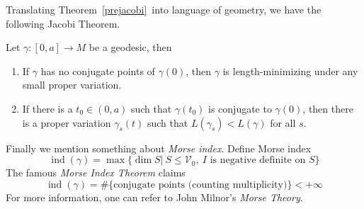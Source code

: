 Translating Theorem~\ref{prejacobi}~into language of geometry, we have the following Jacobi Theorem.
\begin{thm}[Jacobi]
    Let $\gamma:[0,a]\to M$ be a geodesic, then
    \begin{enumerate}[(1)]
        \item If $\gamma$ has no conjugate points of $\gamma(0)$, then $\gamma$ is length-minimizing under any small proper variation.
        \item If there is a $t_0\in(0,a)$ such that $\gamma(t_0)$ is conjugate to $\gamma(0)$, then there is a proper variation $\gamma_s(t)$ such that $L(\gamma_s)<L(\gamma)$ for all $s$.
    \end{enumerate}
\end{thm}

Finally we mention something about \emph{Morse index}.
Define Morse index
\[\operatorname{ind}(\gamma)=\max\{\dim S|\ S\leq\mathscr{V}_0,\ I\text{ is negative definite on }S\}\]
The famous \emph{Morse Index Theorem} claims
\[\operatorname{ind}(\gamma)=\#\{\text{conjugate points (counting multiplicity)}\}<+\infty\]
For more information, one can refer to John Milnor's \emph{Morse Theory}.